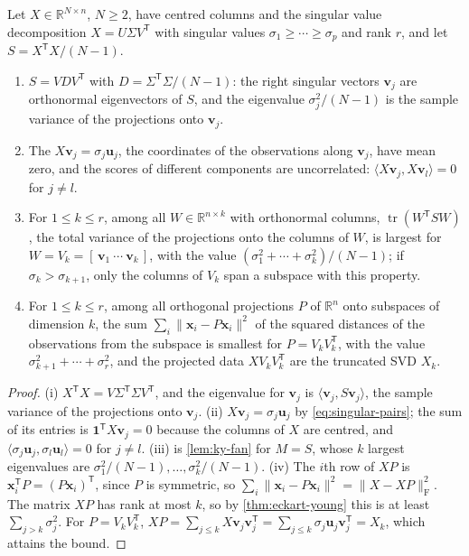 \begin{theorem}
\label{thm:pca}
Let $X\in\mathbb R^{N\times n}$, $N\ge2$, have centred columns and the singular value decomposition $X=U\Sigma V^{\mathsf T}$ with singular values $\sigma_1\ge\cdots\ge\sigma_p$ and rank $r$, and let $S=X^{\mathsf T}X/(N-1)$.
\begin{enumerate}
\item $S=VDV^{\mathsf T}$ with $D=\Sigma^{\mathsf T}\Sigma/(N-1)$: the right singular vectors $\mathbf v_j$ are orthonormal eigenvectors of $S$, and the eigenvalue $\sigma_j^2/(N-1)$ is the sample variance of the projections onto $\mathbf v_j$.
\item The  $X\mathbf v_j=\sigma_j\mathbf u_j$, the coordinates of the observations along $\mathbf v_j$, have mean zero, and the scores of different components are uncorrelated: $\langle X\mathbf v_j,X\mathbf v_l\rangle=0$ for $j\ne l$.
\item For $1\le k\le r$, among all $W\in\mathbb R^{n\times k}$ with orthonormal columns, $\operatorname{tr}(W^{\mathsf T}SW)$, the total variance of the projections onto the columns of $W$, is largest for $W=V_k=[\,\mathbf v_1\ \cdots\ \mathbf v_k\,]$, with the value $(\sigma_1^2+\cdots+\sigma_k^2)/(N-1)$; if $\sigma_k>\sigma_{k+1}$, only the columns of $V_k$ span a subspace with this property.
\item For $1\le k\le r$, among all orthogonal projections $P$ of $\mathbb R^n$ onto subspaces of dimension $k$, the sum $\sum_i\|\mathbf x_i-P\mathbf x_i\|^2$ of the squared distances of the observations from the subspace is smallest for $P=V_kV_k^{\mathsf T}$, with the value $\sigma_{k+1}^2+\cdots+\sigma_r^2$, and the projected data $XV_kV_k^{\mathsf T}$ are the truncated SVD $X_k$.
\end{enumerate}
\end{theorem}

\begin{proof}
(i) $X^{\mathsf T}X=V\Sigma^{\mathsf T}\Sigma V^{\mathsf T}$, and the eigenvalue for $\mathbf v_j$ is $\langle\mathbf v_j,S\mathbf v_j\rangle$, the sample variance of the projections onto $\mathbf v_j$. (ii) $X\mathbf v_j=\sigma_j\mathbf u_j$ by \eqref{eq:singular-pairs}; the sum of its entries is $\mathbf 1^{\mathsf T}X\mathbf v_j=0$ because the columns of $X$ are centred, and $\langle\sigma_j\mathbf u_j,\sigma_l\mathbf u_l\rangle=0$ for $j\ne l$. (iii) is \cref{lem:ky-fan} for $M=S$, whose $k$ largest eigenvalues are $\sigma_1^2/(N-1),\ldots,\sigma_k^2/(N-1)$. (iv) The $i$th row of $XP$ is $\mathbf x_i^{\mathsf T}P=(P\mathbf x_i)^{\mathsf T}$, since $P$ is symmetric, so $\sum_i\|\mathbf x_i-P\mathbf x_i\|^2=\|X-XP\|_{\mathrm F}^2$. The matrix $XP$ has rank at most $k$, so by \cref{thm:eckart-young} this is at least $\sum_{j>k}\sigma_j^2$. For $P=V_kV_k^{\mathsf T}$, $XP=\sum_{j\le k}X\mathbf v_j\mathbf v_j^{\mathsf T}=\sum_{j\le k}\sigma_j\mathbf u_j\mathbf v_j^{\mathsf T}=X_k$, which attains the bound.
\end{proof}

